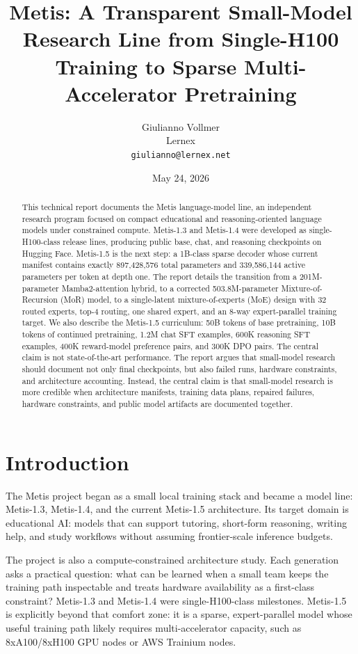 \documentclass[11pt]{article}
\title{Metis: A Transparent Small-Model Research Line from Single-H100 Training to Sparse Multi-Accelerator Pretraining}
\author{Giulianno Vollmer\\Lernex\\\texttt{giulianno@lernex.net}}
\date{May 24, 2026}
\begin{document}
\maketitle

\begin{abstract}
This technical report documents the Metis language-model line, an independent
research program focused on compact educational and reasoning-oriented language
models under constrained compute. Metis-1.3 and Metis-1.4 were developed as
single-H100-class release lines, producing public base, chat, and reasoning
checkpoints on Hugging Face. Metis-1.5 is the next step: a 1B-class sparse
decoder whose current manifest contains exactly 897,428,576 total parameters and
339,586,144 active parameters per token at depth one. The report details the
transition from a 201M-parameter Mamba2-attention hybrid, to a corrected
503.8M-parameter Mixture-of-Recursion (MoR) model, to a single-latent
mixture-of-experts (MoE) design with 32 routed experts, top-4 routing, one
shared expert, and an 8-way expert-parallel training target. We also describe
the Metis-1.5 curriculum: 50B tokens of base pretraining, 10B tokens of
continued pretraining, 1.2M chat SFT examples, 600K reasoning SFT examples,
400K reward-model preference pairs, and 300K DPO pairs. The central claim is not
state-of-the-art performance. The report argues that small-model research
should document not only final checkpoints, but also failed runs, hardware
constraints, and architecture accounting. Instead, the central claim is that
small-model research is more credible when architecture manifests, training
data plans, repaired failures, hardware constraints, and public model artifacts
are documented together.
\end{abstract}

\section{Introduction}

The Metis project began as a small local training stack and became a model line:
Metis-1.3, Metis-1.4, and the current Metis-1.5 architecture. Its target domain
is educational AI: models that can support tutoring, short-form reasoning,
writing help, and study workflows without assuming frontier-scale inference
budgets.

The project is also a compute-constrained architecture study. Each generation
asks a practical question: what can be learned when a small team keeps the
training path inspectable and treats hardware availability as a first-class
constraint? Metis-1.3 and Metis-1.4 were single-H100-class milestones. Metis-1.5
is explicitly beyond that comfort zone: it is a sparse, expert-parallel model
whose useful training path likely requires multi-accelerator capacity, such as
8xA100/8xH100 GPU nodes or AWS Trainium nodes.
\end{document}

